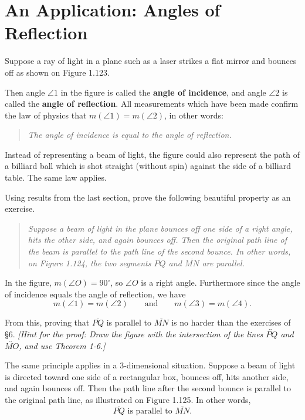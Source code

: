 \documentclass[12pt]{book} %
\begin{document}
\section{An Application: Angles of Reflection}

Suppose a ray of light in a plane such as a laser strikes a flat mirror and bounces off as shown on Figure 1.123.


Then angle $\angle 1$ in the figure is called the \textbf{angle of incidence}, and angle $\angle 2$ is called the \textbf{angle of reflection}. All measurements which have been made confirm the law of physics that $m(\angle 1)=m(\angle 2)$, in other words:

\begin{quote}
	\textit{The angle of incidence is equal to the angle of reflection.}
\end{quote}

Instead of representing a beam of light, the figure could also represent the path of a billiard ball which is shot straight (without spin) against the side of a billiard table. The same law applies.

Using results from the last section, prove the following beautiful property as an exercise.

\begin{quote}
	\textit{Suppose a beam of light in the plane bounces off one side of a right angle, hits the other side, and again bounces off. Then the original path line of the beam is parallel to the path line of the second bounce. In other words, on Figure 1.124, the two segments $\overline{PQ}$ and $\overline{MN}$ are parallel.}
\end{quote}


In the figure, $m(\angle O)=90^\circ$, so $\angle O$ is a right angle. Furthermore since the angle of incidence equals the angle of reflection, we have
\[
m(\angle 1)=m(\angle 2)\qquad \text{and}\qquad m(\angle 3)=m(\angle 4).
\]

From this, proving that $\overline{PQ}$ is parallel to $\overline{MN}$ is no harder than the exercises of \S 6. \textit{[Hint for the proof: Draw the figure with the intersection of the lines $\overleftrightarrow{PQ}$ and $\overleftrightarrow{MO}$, and use Theorem 1-6.]}

The same principle applies in a 3-dimensional situation. Suppose a beam of light is directed toward one side of a rectangular box, bounces off, hits another side, and again bounces off. Then the path line after the second bounce is parallel to the original path line, as illustrated on Figure 1.125. In other words,
\[
\overline{PQ}\text{ is parallel to }\overline{MN}.
\]
\end{document}
